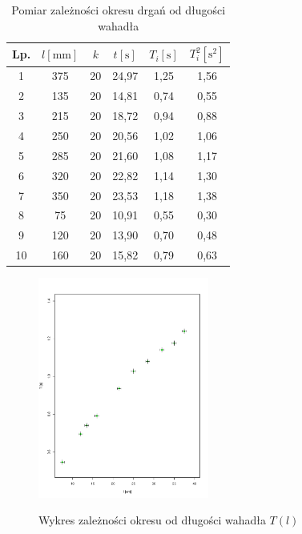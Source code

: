 \documentclass{fizraport}
\begin{document}
\begin{table}[!h]
\caption{Pomiar zależności okresu drgań od długości wahadła}
\label{T:varpos}
\begin{center}
\begin{tabular}{| c | c | c | c | c | c |}
\hline
\textbf{Lp.} & $l[\text{mm}]$
& $k$ & $t [\text{s}]$ & $T_i [\text{s}]$ & $T_i^2 [\text{s}^2]$  \\
\hline
1 & 375 & 20 & 24,97 & 1,25 & 1,56\\ \hline
2 & 135 & 20 & 14,81 & 0,74 & 0,55\\ \hline
3 & 215 & 20 & 18,72 & 0,94 & 0,88\\ \hline
4 & 250 & 20 & 20,56 & 1,02 & 1,06\\ \hline
5 & 285 & 20 & 21,60 & 1,08 & 1,17\\ \hline
6 & 320 & 20 & 22,82 & 1,14 & 1,30\\ \hline
7 & 350 & 20 & 23,53 & 1,18 & 1,38\\ \hline
8 & 75  & 20 & 10,91 & 0,55 & 0,30\\ \hline
9 & 120 & 20 & 13,90 & 0,70 & 0,48\\ \hline
10& 160 & 20 & 15,82 & 0,79 & 0,63\\ \hline

\end{tabular}
\end{center}
\end{table}
\begin{figure}
 \centering
 \includegraphics[width=0.5\textwidth,keepaspectratio=true]{wykresTodl.pdf}
 \label{fig:w2}
   \caption{Wykres zależności okresu od długości wahadła $T(l)$}
\end{figure}
\end{document}
